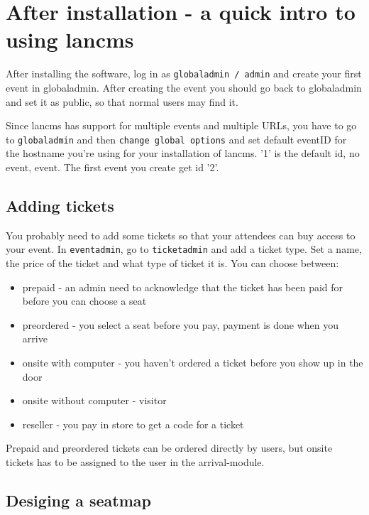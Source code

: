 \chapter{After installation - a quick intro to using lancms}

After installing the software, log in as \lstinline!globaladmin / admin! and
create your first event in globaladmin. After creating the event you should go
back to globaladmin and set it as public, so that normal users may find it.

Since lancms has support for multiple events and multiple URLs, you have to go
to \lstinline!globaladmin! and then \lstinline!change global options! and set default eventID
for the hostname you're using for your installation of lancms.
'1' is the default id, no event, event. The first event you create get id '2'.

\section{Adding tickets}

You probably need to add some tickets so that your attendees can buy access to
your event. In \lstinline!eventadmin!, go to \lstinline!ticketadmin! and add a
ticket type. Set a name, the price of the ticket and what type of ticket it
is. You can choose between:
\begin{itemize}
\item prepaid - an admin need to acknowledge that the ticket has been paid
for before you can choose a seat
\item preordered - you select a seat before you pay, payment is done when you
arrive
\item onsite with computer - you haven't ordered a ticket before you show up
in the door
\item onsite without computer - visitor
\item reseller - you pay in store to get a code for a ticket
\end{itemize}

Prepaid and preordered tickets can be ordered directly by users, but onsite
tickets has to be assigned to the user in the arrival-module.

\section{Desiging a seatmap}


